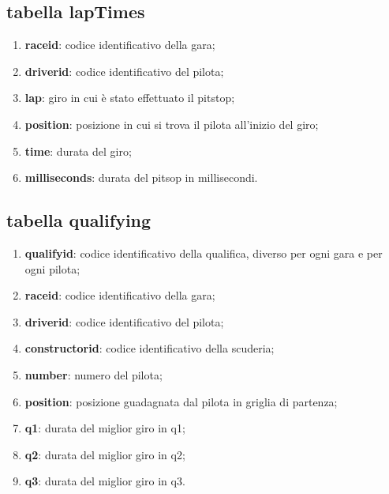 \subsection{tabella lapTimes}%
\begin{enumerate}
    \item \textbf{raceid}: codice identificativo della gara;
    \item \textbf{driverid}: codice identificativo del pilota;
    \item \textbf{lap}: giro in cui è stato effettuato il pitstop;
    \item \textbf{position}: posizione in cui si trova il pilota all'inizio del giro;
    \item \textbf{time}: durata del giro;
    \item \textbf{milliseconds}: durata del pitsop in millisecondi.
\end{enumerate}
\subsection{tabella qualifying}%
\begin{enumerate}
    \item \textbf{qualifyid}: codice identificativo della qualifica, diverso per ogni gara e per ogni pilota;
    \item \textbf{raceid}: codice identificativo della gara;
    \item \textbf{driverid}: codice identificativo del pilota;
    \item \textbf{constructorid}: codice identificativo della scuderia;
    \item \textbf{number}: numero del pilota;
    \item \textbf{position}: posizione guadagnata dal pilota in griglia di partenza;
    \item \textbf{q1}: durata del miglior giro in q1;
    \item \textbf{q2}: durata del miglior giro in q2;
    \item \textbf{q3}: durata del miglior giro in q3.
\end{enumerate}
